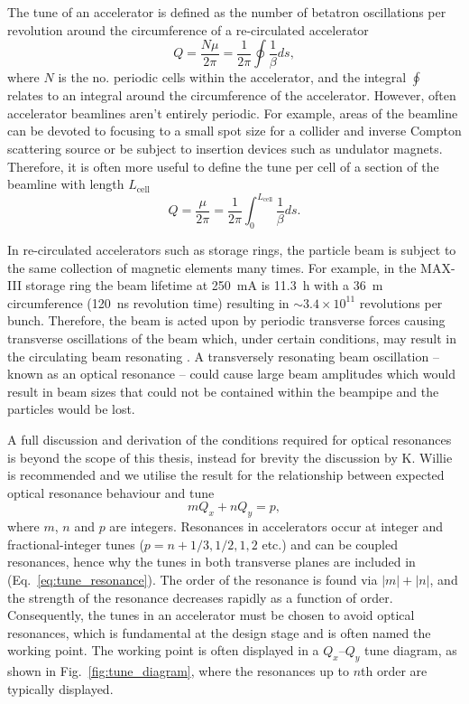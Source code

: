 \documentclass[../main.tex]{subfiles}
\begin{document}
The tune of an accelerator is defined as the number of betatron oscillations per revolution around the circumference of a re-circulated accelerator
\begin{equation}
Q=\frac{N\mu}{2\pi} = \frac{1}{2\pi}\oint\frac{1}{\beta}ds,
\label{eq:accelerator_tune}    
\end{equation}
where $N$ is the no. periodic cells within the accelerator, and the integral $\oint$ relates to an integral around the circumference of the accelerator. However, often accelerator beamlines aren't entirely periodic. For example, areas of the beamline can be devoted to focusing to a small spot size for a collider and inverse Compton scattering source or be subject to insertion devices such as undulator magnets. Therefore, it is often more useful to define the tune per cell of a section of the beamline with length $L_{\mathrm{cell}}$
\begin{equation}
Q=\frac{\mu}{2\pi} = \frac{1}{2\pi}\int_{0}^{L_{\mathrm{cell}}}\frac{1}{\beta}ds. 
\label{eq:tune_per_cell}    
\end{equation}

In re-circulated accelerators such as storage rings, the particle beam is subject to the same collection of magnetic elements many times. For example, in the MAX-III storage ring the beam lifetime at 250~\si{\milli\ampere} is 11.3~\si{\hour} with a 36~\si{\meter} circumference (120~\si{\nano\second} revolution time) resulting in $\sim3.4\times 10^{11}$ revolutions per bunch. Therefore, the beam is acted upon by periodic transverse forces causing transverse oscillations of the beam which, under certain conditions, may result in the circulating beam resonating \cite{wille2000physics}. A transversely resonating beam oscillation -- known as an optical resonance -- could cause large beam amplitudes which would result in beam sizes that could not be contained within the beampipe and the particles would be lost.

A full discussion and derivation of the conditions required for optical resonances is beyond the scope of this thesis, instead for brevity the discussion by K. Willie \cite{wille2000physics} is recommended and we utilise the result for the relationship between expected optical resonance behaviour and tune
\begin{equation}
mQ_{x}+nQ_{y} = p,
\label{eq:tune_resonances}    
\end{equation}
where $m$, $n$ and $p$ are integers. Resonances in accelerators occur at integer and fractional-integer tunes ($p = n + 1/3, 1/2, 1, 2$ etc.) and can be coupled resonances, hence why the tunes in both transverse planes are included in (Eq.~\ref{eq:tune_resonance}). The order of the resonance is found via $\left|m\right| + \left|n\right|$, and the strength of the resonance decreases rapidly as a function of order. Consequently, the tunes in an accelerator must be chosen to avoid optical resonances, which is fundamental at the design stage and is often named the working point. The working point is often displayed in a $Q_{x}$--$Q_{y}$ tune diagram, as shown in Fig.~\ref{fig:tune_diagram}, where the resonances up to $n$th order are typically displayed.  
\end{document}
